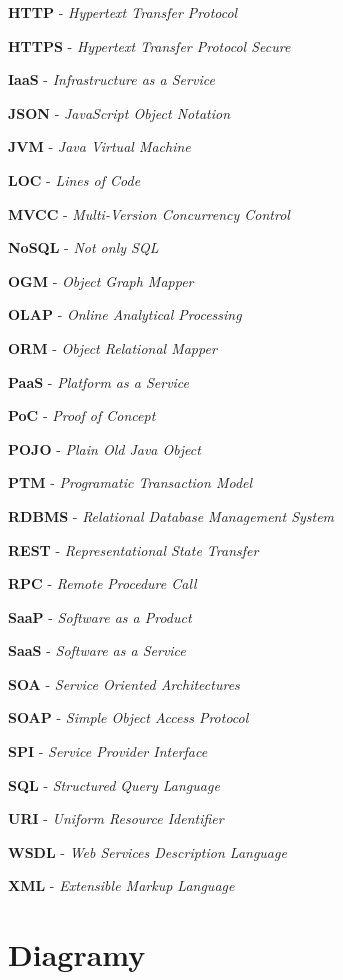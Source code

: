 \documentclass[11pt,twoside,a4paper]{book}
\begin{document}
\textbf{HTTP} - \textit{Hypertext Transfer Protocol}

\textbf{HTTPS} - \textit{Hypertext Transfer Protocol Secure}

\textbf{IaaS} - \textit{Infrastructure as a Service}

\textbf{JSON} - \textit{JavaScript Object Notation}

\textbf{JVM} - \textit{Java Virtual Machine}

\textbf{LOC} - \textit{Lines of Code}

\textbf{MVCC} - \textit{Multi-Version Concurrency Control}

\textbf{NoSQL} - \textit{Not only SQL}

\textbf{OGM} - \textit{Object Graph Mapper}

\textbf{OLAP} - \textit{Online Analytical Processing}

\textbf{ORM} - \textit{Object Relational Mapper}

\textbf{PaaS} - \textit{Platform as a Service}

\textbf{PoC} - \textit{Proof of Concept}

\textbf{POJO} - \textit{Plain Old Java Object}

\textbf{PTM} - \textit{Programatic Transaction Model}

\textbf{RDBMS} - \textit{Relational Database Management System}

\textbf{REST} - \textit{Representational State Transfer}

\textbf{RPC} - \textit{Remote Procedure Call}

\textbf{SaaP} - \textit{Software as a Product}

\textbf{SaaS} - \textit{Software as a Service}

\textbf{SOA} - \textit{Service Oriented Architectures}

\textbf{SOAP} - \textit{Simple Object Access Protocol}

\textbf{SPI} - \textit{Service Provider Interface}

\textbf{SQL} - \textit{Structured Query Language}

\textbf{URI} - \textit{Uniform Resource Identifier}

\textbf{WSDL} - \textit{Web Services Description Language}

\textbf{XML} - \textit{Extensible Markup Language}


\chapter{Diagramy}
\end{document}
